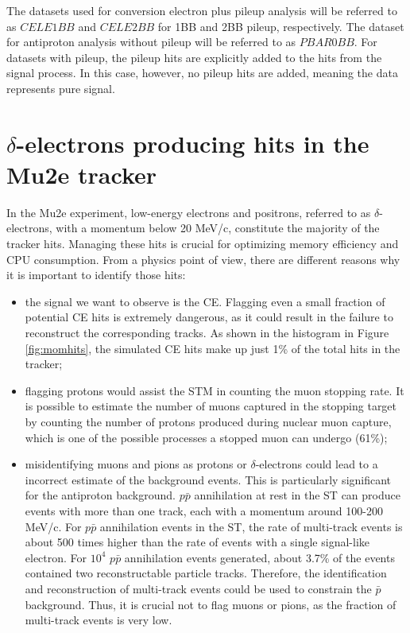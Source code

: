 The datasets used for conversion electron plus pileup 
analysis will be referred to as $CELE1BB$ and $CELE2BB$ 
for 1BB and 2BB pileup, respectively. The dataset for 
antiproton analysis without pileup will be referred to as $PBAR0BB$.
For datasets with pileup, 
the pileup hits are explicitly added to the hits from 
the signal process. In this case, however, no pileup hits 
are added, meaning the data represents pure signal. 
\section{$\delta$-electrons producing hits in the Mu2e tracker}

In the Mu2e experiment, low-energy electrons and positrons, referred to as $\delta$-electrons, 
with a momentum below 20 MeV/c, constitute the majority of the tracker hits. Managing these 
hits is crucial for optimizing memory efficiency and CPU consumption. From a physics point 
of view, there are different reasons why it is important to identify those hits:
\begin{itemize}
    \item the signal we want to observe is the CE. Flagging even a small fraction of 
    potential CE hits is extremely dangerous, as it could result in the failure to 
    reconstruct the corresponding tracks.
    As shown in the histogram in Figure \ref{fig:momhits}, the simulated CE hits make up 
    just 1\% of the total hits in the tracker;
    \item flagging protons would assist the STM in counting the muon stopping rate. 
    It is possible to estimate the number of muons captured in the stopping target 
    by counting the number of protons produced during nuclear muon capture, 
    which is one of the possible processes a stopped muon can undergo (61\%);
    \item misidentifying muons and pions as protons or $\delta$-electrons could lead to a 
    incorrect estimate of the background events. This is particularly significant for the antiproton background.
    $p\bar{p}$ annihilation at rest in the ST can produce events with more than one track, 
    each with a momentum around 100-200 MeV/c. For $p\bar{p}$ annihilation events 
    in the ST, the rate of multi-track events is about 500 times higher 
    than the rate of events with a single signal-like electron. 
    For $10^4$ $p\bar{p}$ annihilation events generated, about 3.7\% of 
    the events contained two reconstructable particle tracks. Therefore, 
    the identification and reconstruction of multi-track events could be 
    used to constrain the $\bar{p}$ background. Thus, it is crucial
     not to flag muons or pions, as the fraction of multi-track events is very low.
\end{itemize}
